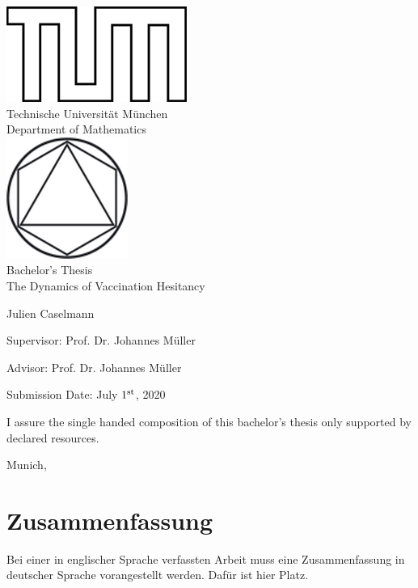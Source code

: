 \documentclass[12pt,a4paper,twoside]{article}
\begin{document}
\pagestyle{empty}
\begin{titlepage}
\begin{center}
\includegraphics{img/TUMlblack.png}\\[3mm]
\sf
{\Large
  Technische Universit\"at M\"unchen\\[5mm]
  Department of Mathematics\\[8mm]
}
\normalsize
\includegraphics{img/TUMlMblack.png}\\[15mm]

Bachelor's Thesis\\[15mm]

{\Huge
  The Dynamics of Vaccination Hesitancy
}
\bigskip

\normalsize

Julien Caselmann
\end{center}
\vspace*{75mm}

Supervisor: Prof. Dr. Johannes M\"uller
\medskip

Advisor: Prof. Dr. Johannes M\"uller
\medskip

Submission Date: July $1^{\textnormal{st}}$, 2020

\end{titlepage}

\vspace*{150mm}

I assure the single handed composition of this bachelor's thesis only supported by declared resources.
\bigskip

Munich,
\newpage
\section*{Zusammenfassung}
Bei einer in englischer Sprache verfassten Arbeit muss eine Zusammenfassung in deutscher Sprache vorangestellt werden.
Daf\"ur ist hier Platz.
\end{document}

